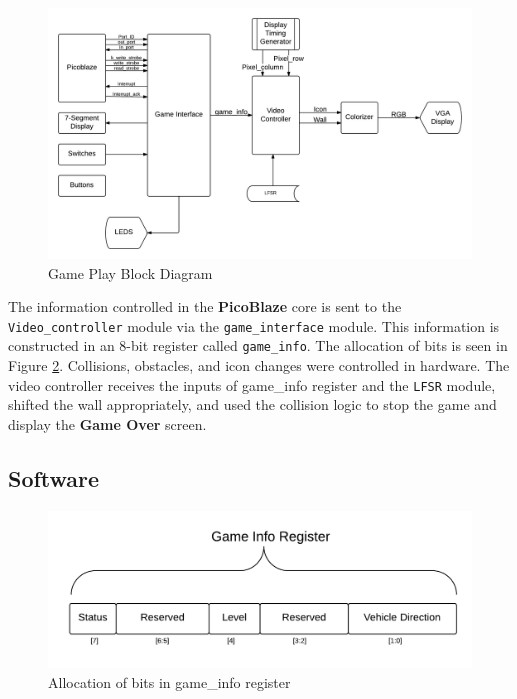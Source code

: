 \documentclass[11pt]{article}
\begin{document}
	\begin{figure}[h]\centering
	\includegraphics[height=0.7\textwidth, width=0.7\textheight]{Images/gameplay_diagram.png}
	\caption{Game Play Block Diagram}
		\label{block_diagram}
	\end{figure}	
		
The information controlled in the \textbf{PicoBlaze} core is sent to the \texttt{Video\_controller} module via the \texttt{game\_interface} module.  This information is constructed in an 8-bit register called \texttt{game\_info}.  The allocation of bits is seen in Figure \ref{game_info_bits}.  Collisions, obstacles, and icon changes were controlled in hardware.  The video controller receives the inputs of game\_info register and the \texttt{LFSR} module, shifted the wall appropriately, and used the collision logic to stop the game and display the \textbf{Game Over} screen.

\subsection{Software}

					
		\begin{figure}[h]\centering
		  \includegraphics[width=.7\textwidth]{Images/game_info_bits.png}
		  \caption{Allocation of bits in game\_info register}
		  \label{game_info_bits}
		\end{figure}	
\end{document}
